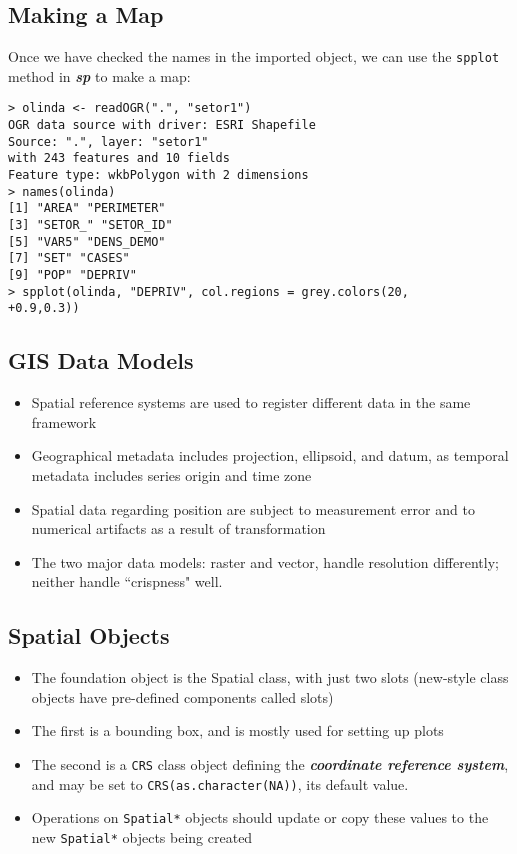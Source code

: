 \documentclass[12pt]{article}
\begin{document}
\newpage
\subsection{Making a Map}
Once we have checked the names in
the imported object, we can use the \texttt{spplot} method in \textit{\textbf{sp}} to make a map:
\begin{framed}
\begin{verbatim}
> olinda <- readOGR(".", "setor1")
OGR data source with driver: ESRI Shapefile
Source: ".", layer: "setor1"
with 243 features and 10 fields
Feature type: wkbPolygon with 2 dimensions
> names(olinda)
[1] "AREA" "PERIMETER"
[3] "SETOR_" "SETOR_ID"
[5] "VAR5" "DENS_DEMO"
[7] "SET" "CASES"
[9] "POP" "DEPRIV"
> spplot(olinda, "DEPRIV", col.regions = grey.colors(20,
+0.9,0.3))
\end{verbatim}
\end{framed}

\subsection{GIS Data Models}
\begin{itemize}
\item Spatial reference systems are used to register different data in
the same framework
\item Geographical metadata includes projection, ellipsoid, and
datum, as temporal metadata includes series origin and time
zone
\item Spatial data regarding position are subject to measurement
error and to numerical artifacts as a result of transformation
\item The two major data models: raster and vector, handle
resolution differently; neither handle ``crispness" well.
\end{itemize}

\subsection{Spatial Objects}
\begin{itemize}
\item The foundation object is the Spatial class, with just two slots
(new-style class objects have pre-defined components called
slots)
\item The first is a bounding box, and is mostly used for setting up
plots
\item The second is a \texttt{CRS} class object defining the \textit{\textbf{coordinate
reference system}}, and may be set to \texttt{CRS(as.character(NA))},
its default value.
\item Operations on \texttt{Spatial*} objects should update or copy these
values to the new \texttt{Spatial*} objects being created
\end{itemize}
\end{document}
